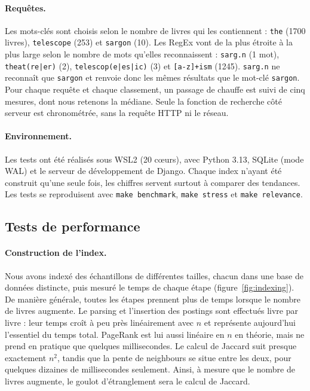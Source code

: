 \documentclass[11pt,a4paper]{article}
\begin{document}
\paragraph{Requêtes.}
Les mots-clés sont choisis selon le nombre de livres qui les contiennent : \texttt{the} (1700 livres), \texttt{telescope} (253) et \texttt{sargon} (10). Les RegEx vont de la plus étroite à la plus large selon le nombre de mots qu'elles reconnaissent : \texttt{sarg.n} (1 mot), \texttt{theat(re|er)} (2), \texttt{telescop(e|es|ic)} (3) et \texttt{[a-z]+ism} (1245). \texttt{sarg.n} ne reconnaît que \texttt{sargon} et renvoie donc les mêmes résultats que le mot-clé \texttt{sargon}. Pour chaque requête et chaque classement, un passage de chauffe est suivi de cinq mesures, dont nous retenons la médiane. Seule la fonction de recherche côté serveur est chronométrée, sans la requête HTTP ni le réseau.

\paragraph{Environnement.}
Les tests ont été réalisés sous WSL2 (20 cœurs), avec Python 3.13, SQLite (mode WAL) et le serveur de développement de Django. Chaque index n'ayant été construit qu'une seule fois, les chiffres servent surtout à comparer des tendances. Les tests se reproduisent avec \texttt{make benchmark}, \texttt{make stress} et \texttt{make relevance}.

\subsection{Tests de performance}

\paragraph{Construction de l'index.}
Nous avons indexé des échantillons de différentes tailles, chacun dans une base de données distincte, puis mesuré le temps de chaque étape (figure~\ref{fig:indexing}). De manière générale, toutes les étapes prennent plus de temps lorsque le nombre de livres augmente. Le parsing et l'insertion des postings sont effectués livre par livre : leur temps croît à peu près linéairement avec $n$ et représente aujourd'hui l'essentiel du temps total. PageRank est lui aussi linéaire en $n$ en théorie, mais ne prend en pratique que quelques millisecondes. Le calcul de Jaccard suit presque exactement $n^2$, tandis que la pente de neighbours se situe entre les deux, pour quelques dizaines de millisecondes seulement. Ainsi, à mesure que le nombre de livres augmente, le goulot d'étranglement sera le calcul de Jaccard.
\end{document}
